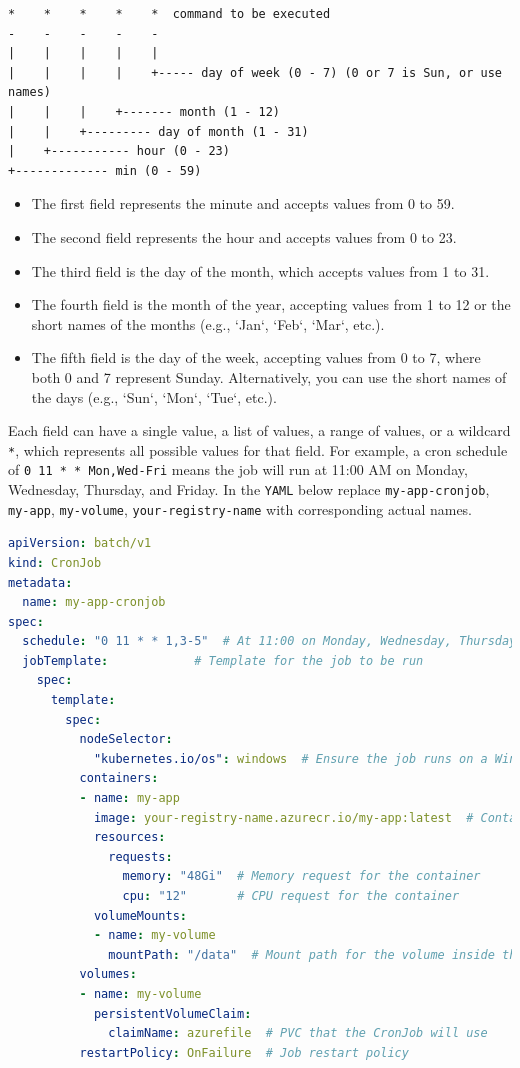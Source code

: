 \documentclass{article}
\begin{document}
\begin{lstlisting}
*    *    *    *    *  command to be executed
-    -    -    -    -
|    |    |    |    |
|    |    |    |    +----- day of week (0 - 7) (0 or 7 is Sun, or use names)
|    |    |    +------- month (1 - 12)
|    |    +--------- day of month (1 - 31)
|    +----------- hour (0 - 23)
+------------- min (0 - 59)
\end{lstlisting}

\begin{itemize}
    \item The first field represents the minute and accepts values from 0 to 59.
    \item The second field represents the hour and accepts values from 0 to 23.
    \item The third field is the day of the month, which accepts values from 1 to 31.
    \item The fourth field is the month of the year, accepting values from 1 to 12 or the short names of the months (e.g., `Jan`, `Feb`, `Mar`, etc.).
    \item The fifth field is the day of the week, accepting values from 0 to 7, where both 0 and 7 represent Sunday. Alternatively, you can use the short names of the days (e.g., `Sun`, `Mon`, `Tue`, etc.).
\end{itemize}

Each field can have a single value, a list of values, a range of values, or a wildcard \texttt{*}, which represents all possible values for that field. For example, a cron schedule of \texttt{0 11 * * Mon,Wed-Fri} means the job will run at 11:00 AM on Monday, Wednesday, Thursday, and Friday. In the \texttt{YAML} below replace \texttt{my-app-cronjob}, \texttt{my-app}, \texttt{my-volume}, \texttt{your-registry-name} with corresponding actual names.


\begin{lstlisting}[language=yaml]
apiVersion: batch/v1
kind: CronJob
metadata:
  name: my-app-cronjob
spec:
  schedule: "0 11 * * 1,3-5"  # At 11:00 on Monday, Wednesday, Thursday, and Friday
  jobTemplate:            # Template for the job to be run
    spec:
      template:
        spec:
          nodeSelector:
            "kubernetes.io/os": windows  # Ensure the job runs on a Windows node
          containers:
          - name: my-app
            image: your-registry-name.azurecr.io/my-app:latest  # Container image to use
            resources:
              requests:
                memory: "48Gi"  # Memory request for the container
                cpu: "12"       # CPU request for the container
            volumeMounts:
            - name: my-volume
              mountPath: "/data"  # Mount path for the volume inside the container
          volumes:
          - name: my-volume
            persistentVolumeClaim:
              claimName: azurefile  # PVC that the CronJob will use
          restartPolicy: OnFailure  # Job restart policy
\end{lstlisting}
\end{document}
